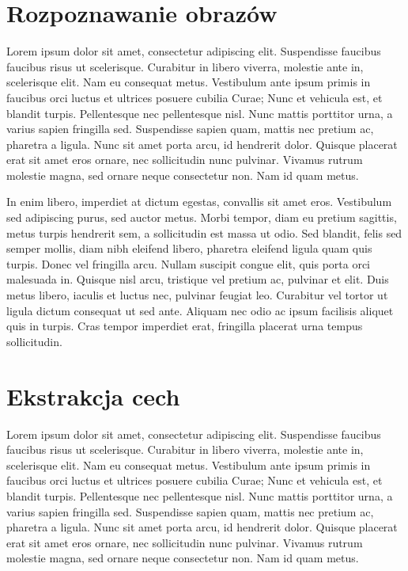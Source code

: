 \section{Rozpoznawanie obrazów}
Lorem ipsum dolor sit amet, consectetur adipiscing elit. Suspendisse faucibus faucibus risus ut scelerisque. Curabitur in libero viverra, molestie ante in, scelerisque elit. Nam eu consequat metus. Vestibulum ante ipsum primis in faucibus orci luctus et ultrices posuere cubilia Curae; Nunc et vehicula est, et blandit turpis. Pellentesque nec pellentesque nisl. Nunc mattis porttitor urna, a varius sapien fringilla sed. Suspendisse sapien quam, mattis nec pretium ac, pharetra a ligula. Nunc sit amet porta arcu, id hendrerit dolor. Quisque placerat erat sit amet eros ornare, nec sollicitudin nunc pulvinar. Vivamus rutrum molestie magna, sed ornare neque consectetur non. Nam id quam metus.

In enim libero, imperdiet at dictum egestas, convallis sit amet eros. Vestibulum sed adipiscing purus, sed auctor metus. Morbi tempor, diam eu pretium sagittis, metus turpis hendrerit sem, a sollicitudin est massa ut odio. Sed blandit, felis sed semper mollis, diam nibh eleifend libero, pharetra eleifend ligula quam quis turpis. Donec vel fringilla arcu. Nullam suscipit congue elit, quis porta orci malesuada in. Quisque nisl arcu, tristique vel pretium ac, pulvinar et elit. Duis metus libero, iaculis et luctus nec, pulvinar feugiat leo. Curabitur vel tortor ut ligula dictum consequat ut sed ante. Aliquam nec odio ac ipsum facilisis aliquet quis in turpis. Cras tempor imperdiet erat, fringilla placerat urna tempus sollicitudin.

\section{Ekstrakcja cech}

Lorem ipsum dolor sit amet, consectetur adipiscing elit. Suspendisse faucibus faucibus risus ut scelerisque. Curabitur in libero viverra, molestie ante in, scelerisque elit. Nam eu consequat metus. Vestibulum ante ipsum primis in faucibus orci luctus et ultrices posuere cubilia Curae; Nunc et vehicula est, et blandit turpis. Pellentesque nec pellentesque nisl. Nunc mattis porttitor urna, a varius sapien fringilla sed. Suspendisse sapien quam, mattis nec pretium ac, pharetra a ligula. Nunc sit amet porta arcu, id hendrerit dolor. Quisque placerat erat sit amet eros ornare, nec sollicitudin nunc pulvinar. Vivamus rutrum molestie magna, sed ornare neque consectetur non. Nam id quam metus.

